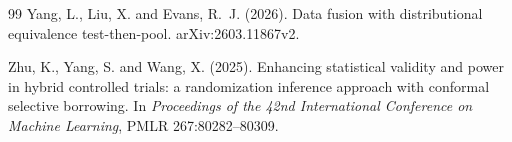 \begin{thebibliography}{99}
Yang, L., Liu, X. and Evans, R.~J. (2026).
\newblock Data fusion with distributional equivalence test-then-pool.
\newblock arXiv:2603.11867v2.

Zhu, K., Yang, S. and Wang, X. (2025).
\newblock Enhancing statistical validity and power in hybrid controlled trials: a randomization inference approach with conformal selective borrowing.
\newblock In \emph{Proceedings of the 42nd International Conference on Machine Learning}, PMLR 267:80282--80309.

\end{thebibliography}
